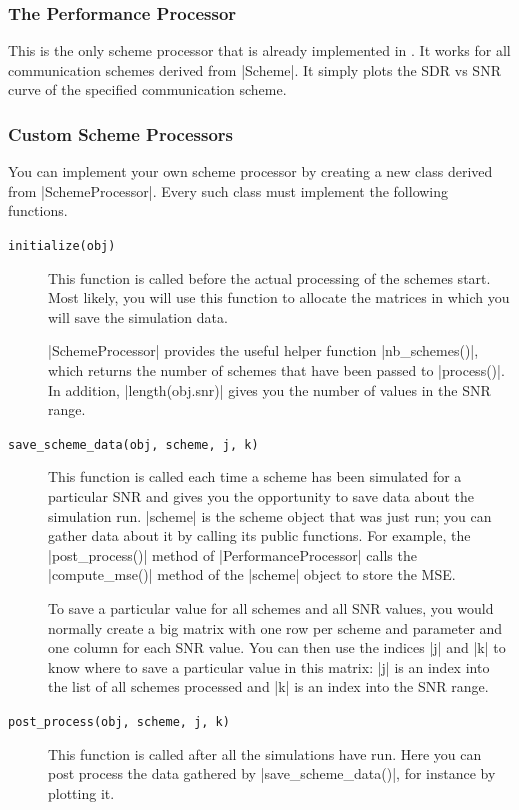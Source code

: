 \subsubsection{The Performance Processor}

This is the only scheme processor that is already implemented in \jscsim. It
works for all communication schemes derived from |Scheme|. It simply plots the
SDR vs SNR curve of the specified communication scheme. 


\subsubsection{Custom Scheme Processors}

You can implement your own scheme processor by creating a new class derived from
|SchemeProcessor|. Every such class must implement the following functions.
\begin{description}
  \item[\texttt{initialize(obj)}] This function is called before the actual
    processing of the schemes start. Most likely, you will use this function to
    allocate the matrices in which you will save the simulation data. 

    |SchemeProcessor| provides the useful helper function |nb_schemes()|, which
    returns the number of schemes that have been passed to |process()|. In
    addition, |length(obj.snr)| gives you the number of values in the SNR range.

  \item[\texttt{save\_scheme\_data(obj, scheme, j, k)}] This function is called
    each time a scheme has been simulated for a particular SNR and gives you the
    opportunity to save data about the simulation run. |scheme| is the scheme
    object that was just run; you can gather data about it by calling its public
    functions. For example, the |post_process()| method of
    |PerformanceProcessor| calls the |compute_mse()| method of the |scheme|
    object to store the MSE.

    To save a particular value for all schemes and all SNR values, you would
    normally create a big matrix with one row per scheme and parameter and one
    column for each SNR value. You can then use the indices |j| and |k| to know
    where to save a particular value in this matrix: |j| is an index into the
    list of all schemes processed and |k| is an index into the SNR range.

  \item[\texttt{post\_process(obj, scheme, j, k)}] This function is called after
    all the simulations have run. Here you can post process the data gathered by
    |save_scheme_data()|, for instance by plotting it.
\end{description}



%
%
%
%

